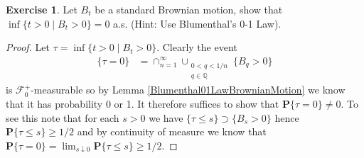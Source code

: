 \documentclass{amsbook}
\theoremstyle{definition}
\newtheorem{xca}{Exercise}
\theoremstyle{remark}
\newcommand{\probability}[1]{\textbf{P}\{#1\}}
\newcommand{\rationals}{\mathbb{Q}}
\begin{document}
\begin{xca}Let $B_t$ be a standard Brownian motion, show that $\inf
  \lbrace t > 0 \mid B_t > 0 \rbrace = 0$ a.s.  (Hint: Use
  Blumenthal's 0-1 Law).
\end{xca}
\begin{proof}
Let $\tau = \inf \lbrace t > 0 \mid B_t > 0 \rbrace$.  Clearly the
event 
\begin{align*}
\lbrace \tau = 0 \rbrace &= \cap_{n=1}^\infty \cup_{\substack{0 < q <
    1/n\\ q \in \rationals}} \lbrace B_q > 0 \rbrace
\end{align*}
is  $\mathcal{F}^+_0$-measurable so by Lemma
  \ref{Blumenthal01LawBrownianMotion} we know that it has probability
  0 or 1.  It therefore suffices to show that $\probability { \tau =
    0} \neq 0$.  To see this note that for each $s > 0$ we have
$\lbrace \tau \leq s \rbrace \supset \lbrace B_s > 0 \rbrace$ hence
$\probability{\tau \leq s} \geq 1/2$ and by continuity of measure we
know that $\probability {\tau = 0} = \lim_{s \downarrow 0} \probability{\tau \leq s} \geq 1/2$.
\end{proof}
\end{document}
